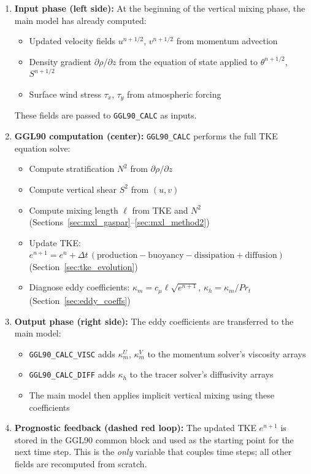 \documentclass[12pt,letterpaper]{article}
\begin{document}
\begin{enumerate}
\item \textbf{Input phase (left side):} At the beginning of the vertical mixing phase, the main model has already computed:
\begin{itemize}
\item Updated velocity fields $u^{n+1/2}$, $v^{n+1/2}$ from momentum advection
\item Density gradient $\partial\rho/\partial z$ from the equation of state applied to $\theta^{n+1/2}$, $S^{n+1/2}$
\item Surface wind stress $\tau_x$, $\tau_y$ from atmospheric forcing
\end{itemize}
These fields are passed to \verb|GGL90_CALC| as inputs.

\item \textbf{GGL90 computation (center):} \verb|GGL90_CALC| performs the full TKE equation solve:
\begin{itemize}
\item Compute stratification $N^2$ from $\partial\rho/\partial z$
\item Compute vertical shear $S^2$ from $(u, v)$
\item Compute mixing length $\ell$ from TKE and $N^2$ (Sections~\ref{sec:mxl_gaspar}--\ref{sec:mxl_method2})
\item Update TKE: $e^{n+1} = e^n + \Delta t \, (\text{production} - \text{buoyancy} - \text{dissipation} + \text{diffusion})$ (Section~\ref{sec:tke_evolution})
\item Diagnose eddy coefficients: $\kappa_m = c_\mu \ell \sqrt{e^{n+1}}$, $\kappa_h = \kappa_m / Pr_t$ (Section~\ref{sec:eddy_coeffs})
\end{itemize}

\item \textbf{Output phase (right side):} The eddy coefficients are transferred to the main model:
\begin{itemize}
\item \verb|GGL90_CALC_VISC| adds $\kappa_m^U$, $\kappa_m^V$ to the momentum solver's viscosity arrays
\item \verb|GGL90_CALC_DIFF| adds $\kappa_h$ to the tracer solver's diffusivity arrays
\item The main model then applies implicit vertical mixing using these coefficients
\end{itemize}

\item \textbf{Prognostic feedback (dashed red loop):} The updated TKE $e^{n+1}$ is stored in the GGL90 common block and used as the starting point for the next time step. This is the \emph{only} variable that couples time steps; all other fields are recomputed from scratch.
\end{enumerate}
\end{document}
